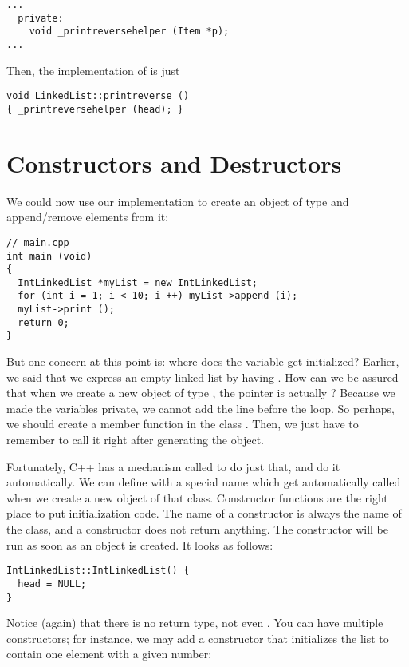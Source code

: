 \begin{verbatim}
...
  private:
    void _printreversehelper (Item *p);
...
\end{verbatim}

Then, the implementation of  is just
\begin{verbatim}
void LinkedList::printreverse ()
{ _printreversehelper (head); }
\end{verbatim}

\section{Constructors and Destructors}
\label{sec:classes:constructors}

We could now use our implementation to create an object of type
 and append/remove elements from it:
\begin{verbatim}
// main.cpp
int main (void)
{
  IntLinkedList *myList = new IntLinkedList;
  for (int i = 1; i < 10; i ++) myList->append (i);
  myList->print ();
  return 0;
}
\end{verbatim}

But one concern at this point is: where does the 
variable get initialized? Earlier, we said that 
we express an empty linked list by having .
How can we be assured that when we create a new object of type
, the pointer is actually ?
Because we made the variables private, we cannot add the line
 before the loop.
So perhaps, we should create a member function  in
the class .
Then, we just have to remember to call it right after generating the object.

Fortunately, C++ has a mechanism called  to do just
that, and do it automatically.
We can define  with a special name which
get automatically called when we create a new object of that class.
Constructor functions are the right place to put initialization code.
The name of a constructor is always the name of the class,
and a constructor does not return anything. 
The constructor will be run as soon as an object is created.
It looks as follows:

\begin{verbatim}
IntLinkedList::IntLinkedList() {
  head = NULL;
}
\end{verbatim}
Notice (again) that there is no return type, not even .
You can have multiple constructors;
for instance, we may add a constructor that initializes the list to
contain one element with a given number:

